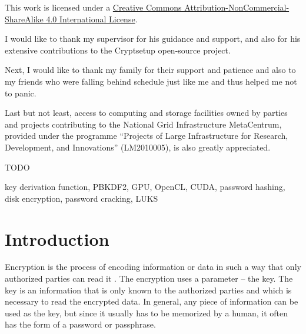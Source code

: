 \documentclass[12pt,oneside]{fithesis2}
\begin{document}
  \FrontMatter                    %
    \ThesisTitlePage                %
    
    This work is licensed under a \href{https://creativecommons.org/licenses/by-nc-sa/4.0/}{Creative Commons Attribution-NonCommercial-ShareAlike 4.0 International License}.
    \begin{center}
      \Large \ccbyncsa
    \end{center}
    
    \begin{ThesisDeclaration}       %
      \DeclarationText
      \AdvisorName
    \end{ThesisDeclaration}
    
    \begin{ThesisThanks}            %
      \sloppy
      I would like to thank my supervisor for his guidance and support, and also for his extensive contributions to the Cryptsetup open-source project.
      
      Next, I would like to thank my family for their support and patience and also to my friends who were falling behind schedule just like me and thus helped me not to panic.
      
      \sloppy
      Last but not least, access to computing and storage facilities owned by parties and projects contributing to the National Grid Infrastructure MetaCentrum, provided under the programme “Projects of Large Infrastructure for Research, Development, and Innovations” (LM2010005), is also greatly appreciated.
    \end{ThesisThanks}
    
    \begin{ThesisAbstract}          %
      TODO
    \end{ThesisAbstract}
    
    \begin{ThesisKeyWords}          %
      key derivation function, PBKDF2, GPU, OpenCL, CUDA, password hashing, disk encryption, password cracking, LUKS
    \end{ThesisKeyWords}
    
    \tableofcontents                %
  
  \MainMatter                     %
    \chapter{Introduction}          %
      Encryption is the process of encoding information or data in such a way that only authorized parties can read it \cite{appliedCrypto, foundations}. The encryption uses a parameter -- the key. The key is an information that is only known to the authorized parties and which is necessary to read the encrypted data. In general, any piece of information can be used as the key, but since it usually has to be memorized by a human, it often has the form of a password or passphrase.
    
\end{document}
